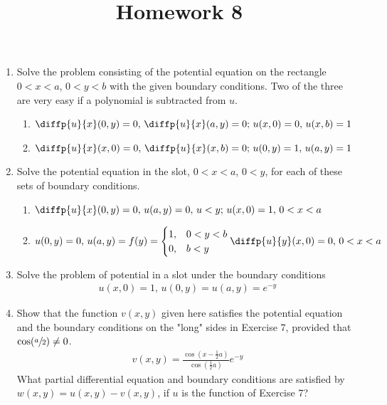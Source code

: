 \documentclass[12pt]{article}
\title{Homework 8}
\begin{document}
\maketitle

\begin{enumerate}
      \item Solve the problem consisting of the potential equation on the rectangle $0<x<a$, $0<y<b$ with the given boundary conditions. Two of the three are very easy if a polynomial is subtracted from $u$.
            \begin{enumerate}
                  \addtocounter{enumii}{1}
                  \item $\diffp{u}{x}(0,y)=0,\, \diffp{u}{x}(a,y)=0;\, u(x,0)=0,\, u(x,b)=1$
                        
                  \item $\diffp{u}{x}(x,0)=0,\, \diffp{u}{x}(x,b)=0;\, u(0,y)=1,\, u(a,y)=1$
                        
            \end{enumerate}
      \item Solve the potential equation in the slot, $0<x<a$, $0<y$, for each of these sets of boundary conditions.
            \begin{enumerate}
                  \item $\diffp{u}{x}(0,y)=0,\, u(a,y)=0,\, u<y;\, u(x,0)=1,\, 0<x<a$
                        
                        \addtocounter{enumii}{1}
                  \item $u(0,y)=0,\, u(a,y)=f(y)=\begin{cases}
                                    1, & 0<y<b \\
                                    0, & b<y
                              \end{cases} \\
                              \diffp{u}{y}(x,0)=0,\, 0<x<a$
                        
            \end{enumerate}
      \item Solve the problem of potential in a slot under the boundary conditions
            \begin{gather*}
                  u(x,0) = 1,\, u(0,y)=u(a,y)=e^{-y}
            \end{gather*}
            
      \item Show that the function $v(x,y)$ given here satisfies the potential equation and the boundary conditions on the "long" sides in Exercise 7, provided that $\cos(\sfrac{a}{2})\ne 0$.
            \begin{gather*}
                  v(x,y)=\frac{\cos\left( x - \frac{1}{2}a \right)}{\cos\left( \frac{1}{2}a \right)} e^{-y}
            \end{gather*}
            What partial differential equation and boundary conditions are satisfied by $w(x,y) = u(x,y) - v(x,y)$, if $u$ is the function of Exercise 7?
            
\end{enumerate}
\end{document}
